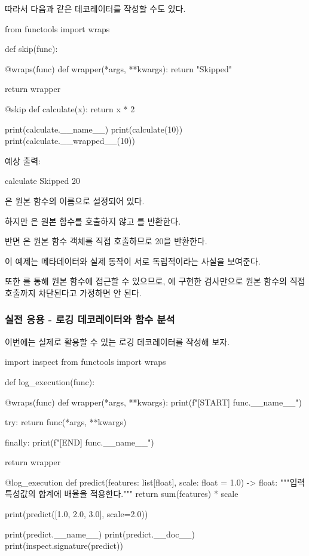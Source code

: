 따라서 다음과 같은 데코레이터를 작성할 수도 있다.

\begin{dhkcode}
from functools import wraps

def skip(func):

    @wraps(func)
    def wrapper(*args, **kwargs):
        return "Skipped"

    return wrapper


@skip
def calculate(x):
    return x * 2


print(calculate.__name__)
print(calculate(10))
print(calculate.__wrapped__(10))
\end{dhkcode}

예상 출력:

\begin{dhkzsh}
calculate
Skipped
20
\end{dhkzsh}

은 원본 함수의 이름으로 설정되어 있다.

하지만 은 원본 함수를 호출하지 않고 를 반환한다.

반면 은 원본 함수 객체를 직접 호출하므로 20을 반환한다.

이 예제는 메타데이터와 실제 동작이 서로 독립적이라는 사실을 보여준다.

또한 를 통해 원본 함수에 접근할 수 있으므로, 에 구현한 검사만으로 원본 함수의 직접 호출까지 차단된다고 가정하면 안 된다.

\subsubsection{실전 응용 - 로깅 데코레이터와 함수 분석}

이번에는 실제로 활용할 수 있는 로깅 데코레이터를 작성해 보자.

\begin{dhkcode}
import inspect
from functools import wraps

def log_execution(func):

    @wraps(func)
    def wrapper(*args, **kwargs):
        print(f"[START] {func.__name__}")

        try:
            return func(*args, **kwargs)

        finally:
            print(f"[END] {func.__name__}")

    return wrapper


@log_execution
def predict(features: list[float], scale: float = 1.0) -> float:
    """입력 특성값의 합계에 배율을 적용한다."""
    return sum(features) * scale


print(predict([1.0, 2.0, 3.0], scale=2.0))

print(predict.__name__)
print(predict.__doc__)
print(inspect.signature(predict))
\end{dhkcode}

